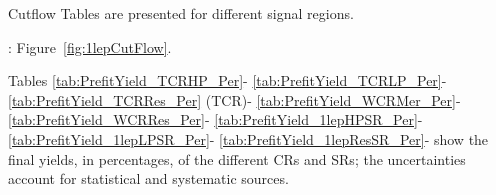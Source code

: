 \label{subsec:cutflows}

Cutflow Tables are presented for different signal regions.

\olep: Figure~\ref{fig:1lepCutFlow}.

Tables
\ref{tab:PrefitYield_TCRHP_Per}-
\ref{tab:PrefitYield_TCRLP_Per}-
\ref{tab:PrefitYield_TCRRes_Per} (TCR)-
\ref{tab:PrefitYield_WCRMer_Per}-
\ref{tab:PrefitYield_WCRRes_Per}-
\ref{tab:PrefitYield_1lepHPSR_Per}-
\ref{tab:PrefitYield_1lepLPSR_Per}-
\ref{tab:PrefitYield_1lepResSR_Per}-
show the final yields, in percentages, of the different CRs and SRs; 
the uncertainties account for statistical and systematic sources.


